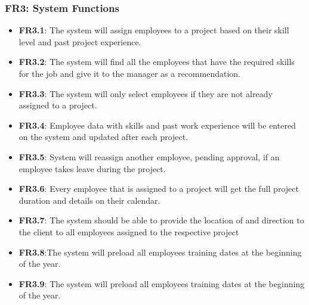 \documentclass[a4paper,12pt]{article}
\begin{document}
	\subsubsection{FR3: System Functions}
	\begin{itemize}
		\item \textbf{FR3.1}: The system will assign employees to a project based
		on their skill level and past project experience. 
		
		\item \textbf{FR3.2}: The system will find all the employees that have the required skills     for the job and give it to the manager as a recommendation.
		
		\item \textbf{FR3.3}: The system will only select employees if they are not already           assigned to a project.
		
		\item \textbf{FR3.4}: Employee data with skills and past work experience
		will be entered on the system and updated after each project. 
		
		\item \textbf{FR3.5}: System will reassign another employee, pending 
		approval, if an employee takes leave during the project.
		
		\item \textbf{FR3.6}: Every employee that is assigned to a project will get
		the full project duration and details on their calendar. 
		
		\item \textbf{FR3.7}: The system should be able to provide the location of and direction      to the client to all employees assigned to the respective project
		
		\item \textbf{FR3.8}:The system will preload all employees training dates
		at the beginning of the year. 
		
		
		\item \textbf{FR3.9}: The system will preload all employees training dates at the beginning of the year.
	\end{itemize}
	
\end{document}
